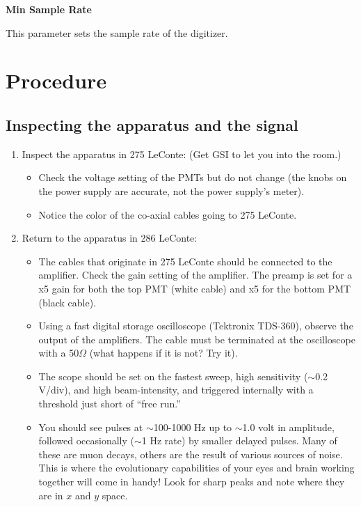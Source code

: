 \documentclass{../lab}
\begin{document}
\textbf{Min Sample Rate}

This parameter sets the sample rate of the digitizer.

\section{Procedure}

\subsection{Inspecting the apparatus and the signal}

\begin{enumerate}
    \item Inspect the apparatus in 275 LeConte: (Get GSI to let you into the room.)

    \begin{itemize}
        \item Check the voltage setting of the PMTs but do not change (the knobs on the power supply are accurate, not the power supply's meter).

        \item Notice the color of the co-axial cables going to 275 LeConte.

    \end{itemize}

    \item Return to the apparatus in 286 LeConte:

    \begin{itemize}
        \item The cables that originate in 275 LeConte should be connected to the amplifier. Check the gain setting of the amplifier. The preamp is set for a x5 gain for both the top PMT (white cable) and x5 for the bottom PMT (black cable).

        \item Using a fast digital storage oscilloscope (Tektronix TDS-360), observe the output of the amplifiers. The cable must be terminated at the oscilloscope with a 50$\Omega$ (what happens if it is not? Try it).

        \item The scope should be set on the fastest sweep, high sensitivity ($\sim$0.2 V/div), and high beam-intensity, and triggered internally with a threshold just short of ``free run.''

        \item You should see pulses at $\sim$100-1000 Hz up to $\sim$1.0 volt in amplitude, followed occasionally ($\sim$1 Hz rate) by smaller delayed pulses. Many of these are muon decays, others are the result of various sources of noise. This is where the evolutionary capabilities of your eyes and brain working together will come in handy! Look for sharp peaks and note where they are in $x$ and $y$ space.


\end{itemize}
\end{enumerate}
\end{document}
